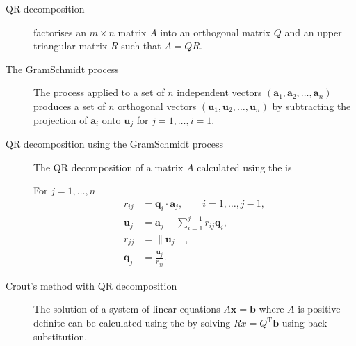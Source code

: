 \documentclass[letterpaper,10pt,english]{jupyterBook}
\begin{document}
\begin{description}
\item[{QR decomposition \label{\detokenize{8_Appendices/8.0_Cheat_sheet:term-QR-decomposition}}}] \leavevmode
\sphinxAtStartPar
{\hyperref[\detokenize{6_Direct_methods/6.4_QR_decomposition:qr-section}]{}} factorises an \(m \times n\) matrix \(A\) into an orthogonal matrix \(Q\) and an upper triangular matrix \(R\) such that \(A = QR\).

\item[{The Gram\sphinxhyphen{}Schmidt process\label{\detokenize{8_Appendices/8.0_Cheat_sheet:term-The-Gram-Schmidt-process}}}] \leavevmode
\sphinxAtStartPar
The {\hyperref[\detokenize{6_Direct_methods/6.4_QR_decomposition:qr-gram-schmidt-section}]{}} process applied to a set of \(n\) independent vectors \((\mathbf{a}_1 ,\mathbf{a}_2 ,\dots ,\mathbf{a}_n)\) produces a set of \(n\) orthogonal vectors \((\mathbf{u}_1 ,\mathbf{u}_2 ,\dots ,\mathbf{u}_n)\) by subtracting the projection of \(\mathbf{a}_i\) onto \(\mathbf{u}_j\) for \(j = 1, \ldots, i = 1\).

\item[{QR decomposition using the Gram\sphinxhyphen{}Schmidt process\label{\detokenize{8_Appendices/8.0_Cheat_sheet:term-QR-decomposition-using-the-Gram-Schmidt-process}}}] \leavevmode
\sphinxAtStartPar
The QR decomposition of a matrix \(A\) calculated using the {\hyperref[\detokenize{6_Direct_methods/6.4_QR_decomposition:qr-gramschmidt-definition}]{}} is

\sphinxAtStartPar
For \(j = 1, \ldots, n\)
\begin{align*}
    r_{ij} &=\mathbf{q}_i \cdot \mathbf{a}_j , \qquad i = 1,\dots ,j-1,\\
    \mathbf{u}_j &= \mathbf{a}_j - \sum_{i=1}^{j-1} r_{ij} \mathbf{q}_i ,\\
    r_{jj} &= \| \mathbf{u}_j \|,\\
    \mathbf{q}_j &=\frac{\mathbf{u}_j }{r_{jj}}.
\end{align*}
\item[{Crout’s method with QR decomposition\label{\detokenize{8_Appendices/8.0_Cheat_sheet:term-Crout-s-method-with-QR-decomposition}}}] \leavevmode
\sphinxAtStartPar
The solution of a system of linear equations \(A \mathbf{x} = \mathbf{b}\) where \(A\) is positive definite can be calculated using the {\hyperref[\detokenize{6_Direct_methods/6.4_QR_decomposition:qr-crout-section}]{}} by solving \(Rx = Q^\mathrm{T} \mathbf{b}\) using back substitution.


\end{description}
\end{document}
